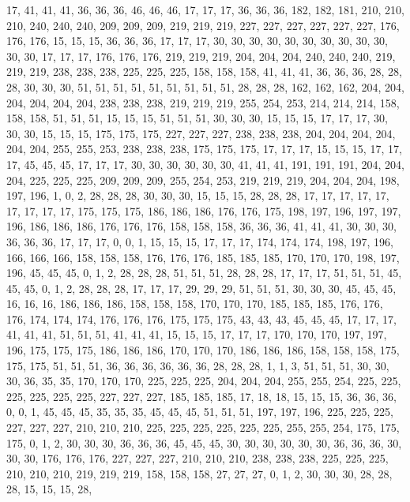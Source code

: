 17, 41, 41, 41, 36, 36, 36, 46, 46, 46, 17, 17, 17, 36, 36, 36, 182, 182, 181, 210, 210, 210, 240, 240, 240, 209, 209, 209, 219, 219, 219, 227,
227, 227, 227, 227, 227, 176, 176, 176, 15, 15, 15, 36, 36, 36, 17, 17, 17, 30, 30, 30, 30, 30, 30, 30, 30, 30, 30, 30, 30, 17, 17, 17,
176, 176, 176, 219, 219, 219, 204, 204, 204, 240, 240, 240, 219, 219, 219, 238, 238, 238, 225, 225, 225, 158, 158, 158, 41, 41, 41, 36, 36, 36, 28, 28,
28, 30, 30, 30, 51, 51, 51, 51, 51, 51, 51, 51, 51, 28, 28, 28, 162, 162, 162, 204, 204, 204, 204, 204, 204, 238, 238, 238, 219, 219, 219, 255,
254, 253, 214, 214, 214, 158, 158, 158, 51, 51, 51, 15, 15, 15, 51, 51, 51, 30, 30, 30, 15, 15, 15, 17, 17, 17, 30, 30, 30, 15, 15, 15,
175, 175, 175, 227, 227, 227, 238, 238, 238, 204, 204, 204, 204, 204, 204, 255, 255, 253, 238, 238, 238, 175, 175, 175, 17, 17, 17, 15, 15, 15, 17, 17,
17, 45, 45, 45, 17, 17, 17, 30, 30, 30, 30, 30, 30, 41, 41, 41, 191, 191, 191, 204, 204, 204, 225, 225, 225, 209, 209, 209, 255, 254, 253, 219,
219, 219, 204, 204, 204, 198, 197, 196, 1, 0, 2, 28, 28, 28, 30, 30, 30, 15, 15, 15, 28, 28, 28, 17, 17, 17, 17, 17, 17, 17, 17, 17,
175, 175, 175, 186, 186, 186, 176, 176, 175, 198, 197, 196, 197, 197, 196, 186, 186, 186, 176, 176, 176, 158, 158, 158, 36, 36, 36, 41, 41, 41, 30, 30,
30, 36, 36, 36, 17, 17, 17, 0, 0, 1, 15, 15, 15, 17, 17, 17, 174, 174, 174, 198, 197, 196, 166, 166, 166, 158, 158, 158, 176, 176, 176, 185,
185, 185, 170, 170, 170, 198, 197, 196, 45, 45, 45, 0, 1, 2, 28, 28, 28, 51, 51, 51, 28, 28, 28, 17, 17, 17, 51, 51, 51, 45, 45, 45,
0, 1, 2, 28, 28, 28, 17, 17, 17, 29, 29, 29, 51, 51, 51, 30, 30, 30, 45, 45, 45, 16, 16, 16, 186, 186, 186, 158, 158, 158, 170, 170,
170, 185, 185, 185, 176, 176, 176, 174, 174, 174, 176, 176, 176, 175, 175, 175, 43, 43, 43, 45, 45, 45, 17, 17, 17, 41, 41, 41, 51, 51, 51, 41,
41, 41, 15, 15, 15, 17, 17, 17, 170, 170, 170, 197, 197, 196, 175, 175, 175, 186, 186, 186, 170, 170, 170, 186, 186, 186, 158, 158, 158, 175, 175, 175,
51, 51, 51, 36, 36, 36, 36, 36, 36, 28, 28, 28, 1, 1, 3, 51, 51, 51, 30, 30, 30, 36, 35, 35, 170, 170, 170, 225, 225, 225, 204, 204,
204, 255, 255, 254, 225, 225, 225, 225, 225, 225, 227, 227, 227, 185, 185, 185, 17, 18, 18, 15, 15, 15, 36, 36, 36, 0, 0, 1, 45, 45, 45, 35,
35, 35, 45, 45, 45, 51, 51, 51, 197, 197, 196, 225, 225, 225, 227, 227, 227, 210, 210, 210, 225, 225, 225, 225, 225, 225, 255, 255, 254, 175, 175, 175,
0, 1, 2, 30, 30, 30, 36, 36, 36, 45, 45, 45, 30, 30, 30, 30, 30, 30, 36, 36, 36, 30, 30, 30, 176, 176, 176, 227, 227, 227, 210, 210,
210, 238, 238, 238, 225, 225, 225, 210, 210, 210, 219, 219, 219, 158, 158, 158, 27, 27, 27, 0, 1, 2, 30, 30, 30, 28, 28, 28, 15, 15, 15, 28,
